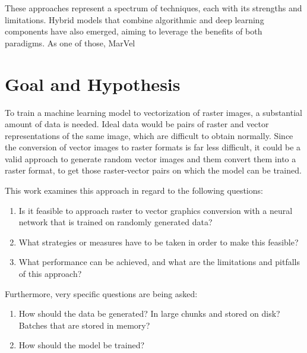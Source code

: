 \documentclass[12pt, a4paper, titlepage]{report}
\begin{document}
These approaches represent a spectrum of techniques, each with its strengths and limitations. Hybrid models that combine algorithmic and deep learning components have also emerged, aiming to leverage the benefits of both paradigms. As one of those, MarVel




\chapter{Goal and Hypothesis}

To train a machine learning model to vectorization of raster images, a substantial amount of data is needed. Ideal data would be pairs of raster and vector representations of the same image, which are difficult to obtain normally. Since the conversion of vector images to raster formats is far less difficult, it could be a valid approach to generate random vector images and them convert them into a raster format, to get those raster-vector pairs on which the model can be trained.


This work examines this approach in regard to the following questions:

\begin{enumerate}[label=\Roman*]
   \item Is it feasible to approach raster to vector graphics conversion with a neural network that is trained on randomly generated data?
   \item What strategies or measures have to be taken in order to make this feasible?
   \item What performance can be achieved, and what are the limitations and pitfalls of this approach?
\end{enumerate}


Furthermore, very specific questions are being asked:

\begin{enumerate}[label=\Roman*]
   \item How should the data be generated? In large chunks and stored on disk? Batches that are stored in memory?
   \item How should the model be trained?
\end{enumerate}

\end{document}

